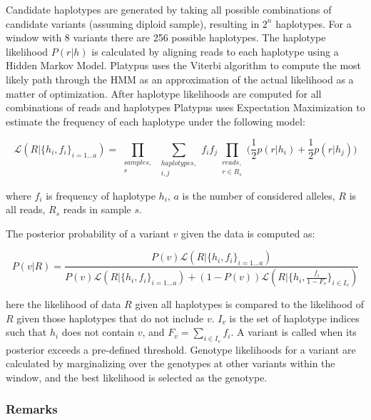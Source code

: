 Candidate haplotypes are generated by taking all possible combinations of candidate variants (assuming diploid sample), resulting in  $2^n$ haplotypes. For a window with 8 variants there are 256 possible haplotypes. The haplotype likelihood $P(r|h)$ is calculated by aligning reads to each haplotype using a Hidden Markov Model. Platypus uses the Viterbi algorithm\autocite{forney1973viterbi} to compute the most likely path through the HMM as an approximation of the actual likelihood as a matter of optimization. After haplotype likelihoods are computed for all combinations of reads and haplotypes Platypus uses Expectation Maximization to estimate the frequency of each haplotype under the following model:

\begin{equation}
    \label{eq:platypus_likelihood_model}
    \mathcal{L}(R|\{h_i,f_i\}_{i=1 \dots a}) = \prod_{\substack{samples,\\ s}} \sum_{\substack{haplotypes,\\ i,j}} f_i f_j \prod_{\substack{reads,\\ r\in{R_s}}}\bigg(\frac{1} {2}{p(r|h_i)}+ \frac {1} {2}{p(r|h_j)}\bigg)
\end{equation}

where $f_i$ is frequency of haplotype $h_i$, $a$ is the number of considered alleles, $R$ is all reads, $R_s$ reads in sample $s$.

The posterior probability of a variant $v$ given the data is computed as:

\begin{equation}
    \label{eq:platypus_variant_posterior}
    P(v|R) = \frac {P(v)\mathcal{L}(R|\{h_i,f_i\}_{i=1\dots a})} {P(v)\mathcal{L}(R|\{h_i,f_i\}_{i=1\dots a}) + (1-P(v))\mathcal{L}(R|\{h_i,\frac{f_i}{1-F_v}\}_{i \in I_v})}
\end{equation}

here the likelihood of data $R$ given all haplotypes is compared to the likelihood of $R$ given those haplotypes that do not include $v$. $I_v$ is the set of haplotype indices such that $h_i$ does not contain $v$, and $F_v = \sum_{i \in I_v}f_i$. A variant is called when its posterior exceeds a pre-defined threshold. Genotype likelihoods for a variant are calculated by marginalizing over the genotypes at other variants within the window, and the best likelihood is selected as the genotype.

\subsubsection{Remarks}

